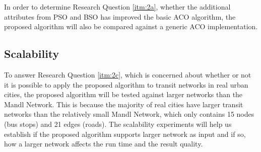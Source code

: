 In order to determine Research Question \vref{itm:2a}, whether the additional attributes from PSO and BSO has improved the basic ACO algorithm, the proposed algorithm will also be compared against a generic ACO implementation.

\subsection{Scalability}
To answer Research Question \vref{itm:2c}, which is concerned about whether or not it is possible to apply the proposed algorithm to transit networks in real urban cities, the proposed algorithm will be tested against larger networks than the Mandl Network. This is because the majority of real cities have larger transit networks than the relatively small Mandl Network, which only contains 15 nodes (bus stops) and 21 edges (roads). The scalability experiments will help us establish if the proposed algorithm supports larger network as input and if so, how a larger network affects the run time and the result quality.




